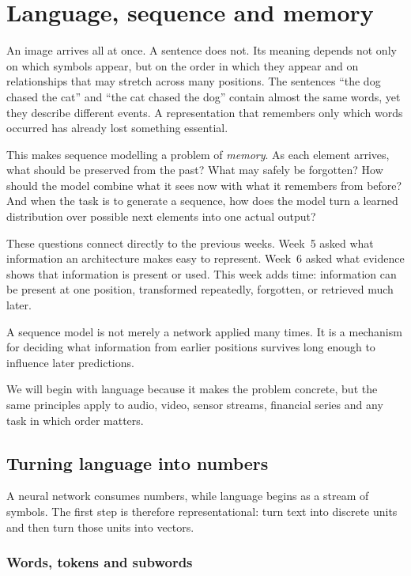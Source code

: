 \chapter{Language, sequence and memory}
\label{chap:week07}

An image arrives all at once. A sentence does not. Its meaning depends not only on which symbols appear, but on the order in which they appear and on relationships that may stretch across many positions. The sentences ``the dog chased the cat'' and ``the cat chased the dog'' contain almost the same words, yet they describe different events. A representation that remembers only which words occurred has already lost something essential.

This makes sequence modelling a problem of \emph{memory}. As each element arrives, what should be preserved from the past? What may safely be forgotten? How should the model combine what it sees now with what it remembers from before? And when the task is to generate a sequence, how does the model turn a learned distribution over possible next elements into one actual output?

These questions connect directly to the previous weeks. Week~5 asked what information an architecture makes easy to represent. Week~6 asked what evidence shows that information is present or used. This week adds time: information can be present at one position, transformed repeatedly, forgotten, or retrieved much later.

\begin{keyidea}
A sequence model is not merely a network applied many times. It is a mechanism for deciding what information from earlier positions survives long enough to influence later predictions.
\end{keyidea}

We will begin with language because it makes the problem concrete, but the same principles apply to audio, video, sensor streams, financial series and any task in which order matters.

\section{Turning language into numbers}

A neural network consumes numbers, while language begins as a stream of symbols. The first step is therefore representational: turn text into discrete units and then turn those units into vectors.

\subsection{Words, tokens and subwords}

